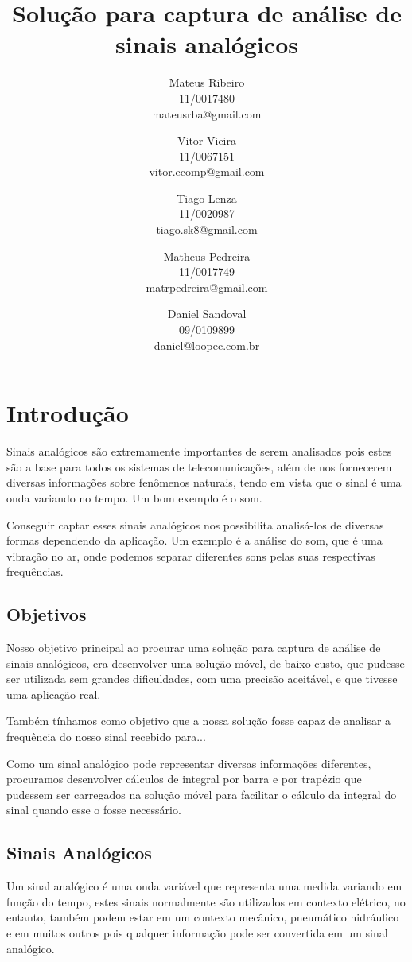 \documentclass[12pt,a4paper]{report}
\title{Solução para captura de análise de sinais analógicos}
\author{Mateus Ribeiro\\
	11/0017480\\
	mateusrba@gmail.com
	\and
	Vitor Vieira\\
	11/0067151\\
	vitor.ecomp@gmail.com
	\and
	Tiago Lenza\\
	11/0020987\\
	tiago.sk8@gmail.com
	\and
	Matheus Pedreira\\
	11/0017749\\
	matrpedreira@gmail.com
	\and
	Daniel Sandoval\\
	09/0109899\\
	daniel@loopec.com.br}
\begin{document}
\maketitle
\tableofcontents

\chapter{Introdução}

Sinais analógicos são extremamente importantes de serem analisados pois estes são a base para todos os sistemas de telecomunicações, além de nos fornecerem diversas informações sobre fenômenos naturais, tendo em vista que o sinal é uma onda variando no tempo. Um bom exemplo é o som.

Conseguir captar esses sinais analógicos nos possibilita analisá-los de diversas formas dependendo da aplicação. Um exemplo é a análise do som, que é uma vibração no ar, onde podemos separar diferentes sons pelas suas respectivas frequências.

\section{Objetivos}

Nosso objetivo principal ao procurar uma solução para captura de análise de sinais analógicos, era desenvolver uma solução móvel, de baixo custo, que pudesse ser utilizada sem grandes dificuldades, com uma precisão aceitável, e que tivesse uma aplicação real.

Também tínhamos como objetivo que a nossa solução fosse capaz de analisar a frequência do nosso sinal recebido para...


Como um sinal analógico pode representar diversas informações diferentes, procuramos desenvolver cálculos de integral por barra e por trapézio que pudessem ser carregados na solução móvel para facilitar o cálculo da integral do sinal quando esse o fosse necessário.

\section{Sinais Analógicos}

Um sinal analógico é uma onda variável que representa uma medida variando em função do tempo, estes sinais normalmente são utilizados em contexto elétrico, no entanto, também podem estar em um contexto mecânico, pneumático hidráulico e em muitos outros pois qualquer informação pode ser convertida em um sinal analógico.
\end{document}
